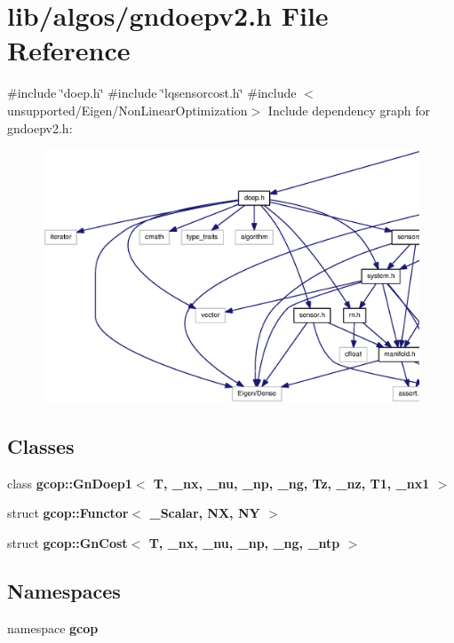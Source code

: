 \section{lib/algos/gndoepv2.h \-File \-Reference}
\label{gndoepv2_8h}
{\ttfamily \#include \char`\"{}doep.\-h\char`\"{}}\*
{\ttfamily \#include \char`\"{}lqsensorcost.\-h\char`\"{}}\*
{\ttfamily \#include $<$unsupported/\-Eigen/\-Non\-Linear\-Optimization$>$}\*
\-Include dependency graph for gndoepv2.\-h\-:
\nopagebreak
\begin{figure}[H]
\begin{center}
\leavevmode
\includegraphics[width=350pt]{gndoepv2_8h__incl}
\end{center}
\end{figure}
\subsection*{\-Classes}
\begin{DoxyCompactItemize}
\item 
class {\bf gcop\-::\-Gn\-Doep1$<$ T, \-\_\-nx, \-\_\-nu, \-\_\-np, \-\_\-ng, Tz, \-\_\-nz, T1, \-\_\-nx1 $>$}
\item 
struct {\bf gcop\-::\-Functor$<$ \-\_\-\-Scalar, N\-X, N\-Y $>$}
\item 
struct {\bf gcop\-::\-Gn\-Cost$<$ T, \-\_\-nx, \-\_\-nu, \-\_\-np, \-\_\-ng, \-\_\-ntp $>$}
\end{DoxyCompactItemize}
\subsection*{\-Namespaces}
\begin{DoxyCompactItemize}
\item 
namespace {\bf gcop}
\end{DoxyCompactItemize}
